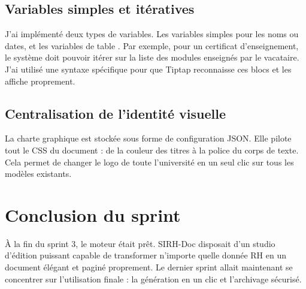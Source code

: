 \subsection{Variables simples et itératives}

J'ai implémenté deux types de variables. Les variables \og simples \fg{} pour les noms ou dates, et les variables \og de table \fg{}. Par exemple, pour un certificat d'enseignement, le système doit pouvoir itérer sur la liste des modules enseignés par le vacataire. J'ai utilisé une syntaxe spécifique pour que Tiptap reconnaisse ces blocs et les affiche proprement.

\subsection{Centralisation de l'identité visuelle}

La charte graphique est stockée sous forme de configuration JSON. Elle pilote tout le CSS du document : de la couleur des titres à la police du corps de texte. Cela permet de changer le logo de toute l'université en un seul clic sur tous les modèles existants.

\section{Conclusion du sprint}

À la fin du sprint 3, le moteur était prêt. SIRH-Doc disposait d'un studio d'édition puissant capable de transformer n'importe quelle donnée RH en un document élégant et paginé proprement. Le dernier sprint allait maintenant se concentrer sur l'utilisation finale : la génération en un clic et l'archivage sécurisé.
